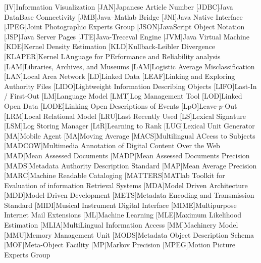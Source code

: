 [IV]{Information Visualization}
[JAN]{Japanese Article Number}
[JDBC]{Java DataBase Connectivity}
[JMB]{Java--Matlab Bridge}
[JNI]{Java Native Interface}
[JPEG]{Joint Photographic Experts Group}
[JSON]{JavaScript Object Notation}
[JSP]{Java Server Pages}
[JTE]{Java-Treceval Engine}
[JVM]{Java Virtual Machine}
[KDE]{Kernel Density Estimation}
[KLD]{Kullback-Leibler Divergence}
[KLAPER]{Kernel LAnguage for PErformance and Reliability analysis}
[LAM]{Libraries, Archives, and Museums}
[LAM]{Logistic Average Misclassification}
[LAN]{Local Area Network}
[LD]{Linked Data}
[LEAF]{Linking and Exploring Authority Files}
[LIDO]{Lightweight Information Describing Objects}
[LIFO]{Last-In / First-Out}
[LM]{Language Model}
[LMT]{Log Management Tool}
[LOD]{Linked Open Data}
[LODE]{Linking Open Descriptions of Events}
[LpO]{Leave-$p$-Out}
[LRM]{Local Relational Model}
[LRU]{Last Recently Used}
[LS]{Lexical Signature}
[LSM]{Log Storing Manager}
[LtR]{Learning to Rank}
[LUG]{Lexical Unit Generator}
[MA]{Mobile Agent}
[MA]{Moving Average}
[MACS]{Multilingual ACcess to Subjects}
[MADCOW]{Multimedia Annotation of Digital Content Over the Web}
[MAD]{Mean Assessed Documents}
[MADP]{Mean Assessed Documents Precision}
[MADS]{Metadata Authority Description Standard}
[MAP]{Mean Average Precision}
[MARC]{Machine Readable Cataloging}
[MATTERS]{MATlab Toolkit for Evaluation of information Retrieval Systems}
[MDA]{Model Driven Architecture}
[MDD]{Model-Driven Development}
[METS]{Metadata Encoding and Transmission Standard}
[MIDI]{Musical Instrument Digital Interface}
[MIME]{Multipurpose Internet Mail Extensions}
[ML]{Machine Learning}
[MLE]{Maximum Likelihood Estimation}
[MLIA]{MultiLingual Information Access}
[MM]{Machinery Model}
[MMU]{Memory Management Unit}
[MODS]{Metadata Object Description Schema}
[MOF]{Meta-Object Facility}
[MP]{Markov Precision}
[MPEG]{Motion Picture Experts Group}
